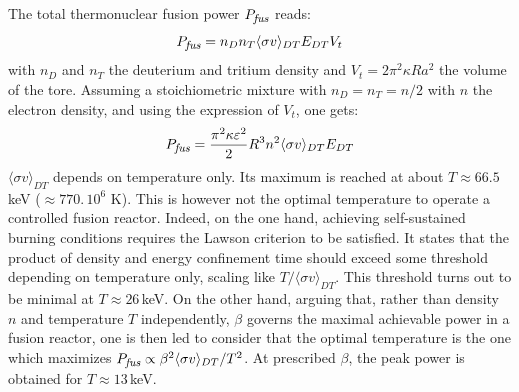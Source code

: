 \documentclass[12pt]{iopart}
\newcommand{\Pfus}{{P_{\textrm{\it\footnotesize fus}}}}
\begin{document}
The total thermonuclear fusion power $\Pfus$ reads: 
\begin{equation*}
\Pfus = n_D n_T \langle \sigma v \rangle_{DT} E_{DT} V_t
\end{equation*}
with $n_D$ and $n_T$ the deuterium and tritium density and $V_t = 2\pi^2 \kappa R a^2$ the volume of the tore. Assuming a stoichiometric mixture with $n_D =n_T = n/2$ with $n$ the electron density, and using the expression of $V_t$, one gets:
\begin{equation*}
\Pfus = \frac{\pi^2 \kappa \varepsilon^2}{2}  R^3 n^2 \langle \sigma v \rangle_{DT} E_{DT}
\end{equation*}
$\langle \sigma v \rangle_{DT}$ depends on temperature only. 
Its maximum is reached at about $T \approx 66.5\,$keV ($\approx 770.\,10^6$ K). This is however not the optimal temperature to operate a controlled fusion reactor. Indeed, on the one hand, achieving self-sustained burning conditions requires the Lawson criterion to be satisfied. It states that the product of density and energy confinement time should exceed some threshold depending on temperature only, scaling like $T/\langle \sigma v \rangle_{DT}$. This threshold turns out to be minimal at $T \approx 26\,$keV. On the other hand, arguing that, rather than density $n$ and temperature $T$ independently, $\beta$ governs the maximal achievable power in a fusion reactor, one is then led to consider that the optimal temperature is the one which maximizes $\Pfus \propto \beta^2 \langle \sigma v \rangle_{DT} / T^2$. At prescribed $\beta$, the peak power is obtained for $T\approx 13\,$keV.
\end{document}
